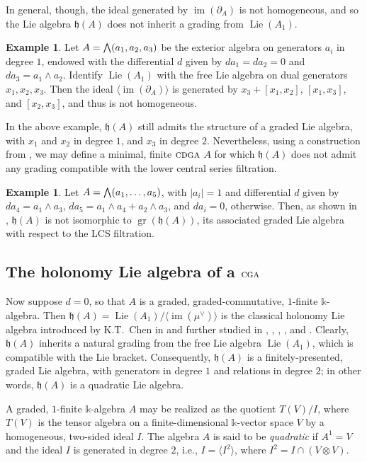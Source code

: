 \documentclass{article}
\numberwithin{equation}{section}
\theoremstyle{definition}
\newtheorem{example}[theorem]{Example}
\renewcommand{\k}{\mathbb{k}}
\newcommand{\h}{{\mathfrak{h}}}
\newcommand{\cga}{\ensuremath{\textsc{cga}}}
\newcommand{\cdga}{\ensuremath{\textsc{cdga}}}
\DeclareMathOperator{\gr}{gr}
\DeclareMathOperator{\im}{im}
\DeclareMathOperator{\Lie}{Lie}
\newcommand{\abs}[1]{\left| #1 \right|}
\newcommand{\bwedge}{\mbox{\normalsize $\bigwedge$}}
\begin{document}
In general, though, the ideal generated by $\im(\partial_A)$ 
is not homogeneous, and so the Lie algebra $\h(A)$ does not 
inherit a grading from $\Lie(A_1)$. 

\begin{example}
\label{ex:heis-lie}
Let $A=\bwedge(a_1,a_2,a_3)$ be the exterior algebra on generators $a_i$ 
in degree $1$, endowed with the differential $d$ given by $d{a_1}=d{a_2}=0$ 
and $d{a_3}=a_1 \wedge a_2$.  Identify $\Lie(A_1)$ with the free Lie algebra 
on dual generators $x_1,x_2,x_3$. Then the ideal $\langle\im(\partial_A)\rangle$ is 
generated by $x_3+[x_1,x_2]$, $[x_1,x_3]$, and $[x_2,x_3]$, and thus 
is not homogeneous. 
\end{example}

In the above example,  $\h(A)$ still admits the structure 
of a graded Lie algebra, with $x_1$ and $x_2$ in degree $1$, and $x_3$ in degree $2$.
Nevertheless, using a construction from \cite{SW-forum}, we may define a minimal, finite 
$\cdga$ $A$ for which $\h(A)$ does not admit any grading compatible with the 
lower central series filtration.

\begin{example}
\label{ex:noncarnot}
Let $A=\bwedge(a_1,\dots, a_5)$, with $\abs{a_i}=1$ and differential $d$ given by 
$d{a_4}=a_1 \wedge a_3$, $d{a_5}=a_1 \wedge a_4+a_2 \wedge a_3$, 
and $d{a_i}=0$, otherwise. Then, as shown in \cite[Example 10.5]{SW-forum}, 
$\h(A)$ is not isomorphic to $\gr(\h(A))$, its associated 
graded Lie algebra with respect to the LCS filtration.
\end{example}

\subsection{The holonomy Lie algebra of a $\cga$}
\label{subsec:holo-ga}
Now suppose $d=0$, so that $A$ is a graded, graded-commutative,  
$1$-finite $\k$-algebra. Then 
$\h(A) = \Lie(A_1) / \langle\im (\mu^{\vee})\rangle$ is the classical holonomy 
Lie algebra introduced by K.T.~Chen in \cite{Chen73} and further studied 
in \cite{Kohno}, \cite{MP}, \cite{PS-imrn04}, \cite{SW-jpaa}, and \cite{SW-forum}. 
Clearly, $\h(A)$ inherits a natural grading from the free Lie algebra 
$\Lie(A_1)$, which is compatible with the Lie bracket.  
Consequently, $\h(A)$ is a finitely-presented, graded 
Lie algebra, with generators in degree $1$ and relations in 
degree $2$; in other words, $\h(A)$ is a quadratic Lie algebra.  

A  graded, $1$-finite $\k$-algebra $A$ may be realized as the quotient 
$T(V)/I$, where $T(V)$ is the tensor algebra on a finite-dimensional 
$\k$-vector space $V$ by a homogeneous, two-sided ideal $I$. 
The algebra $A$ is said to be {\em quadratic}\/ if $A^1=V$ 
and the ideal $I$ is generated in degree $2$, i.e., $I=\langle I^2 \rangle$, 
where $I^2=I\cap (V\otimes V)$.  
\end{document}
